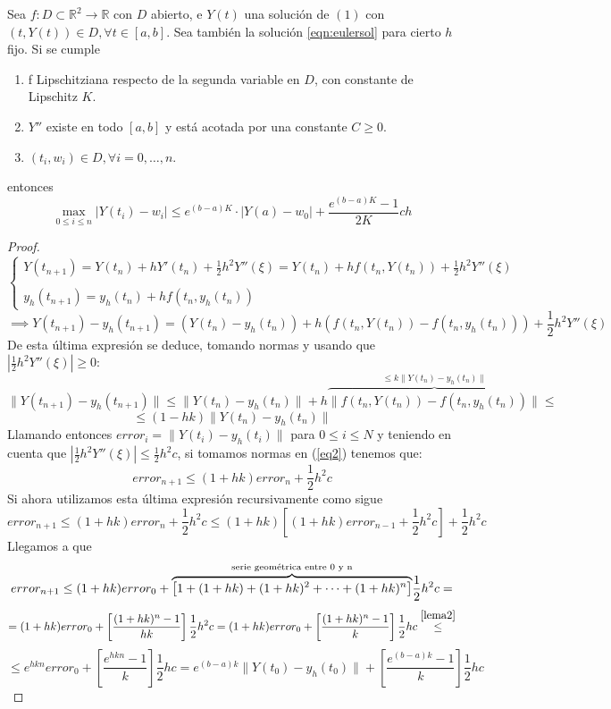 \begin{theorem}
    Sea $f:D\subset \mathbb{R}^2\rightarrow \mathbb{R}$ con $D$ abierto, e $Y(t)$ una solución de $(1)$ con $(t,Y(t))\in D,\forall t\in[a,b]$. Sea también la solución \ref{eqn:eulersol} para cierto $h$ fijo. Si se cumple
    \begin{enumerate}[label=(\alph*)]
        \item f Lipschitziana respecto de la segunda variable en $D$, con constante de Lipschitz $K$.
        \item $Y''$ existe en todo $[a,b]$ y está acotada por una constante $C\geq 0$.
        \item $(t_i,w_i)\in D,\forall i=0,\dots,n$.
    \end{enumerate}
    entonces $$\max_{0\leq i \leq n}|Y(t_i)-w_i| \leq e^{(b-a)K}\cdot |Y(a)-w_0| + \frac{e^{(b-a)K}-1}{2K}ch$$

\end{theorem}
\begin{proof}
    \begin{equation}
\label{eq1}
\left\{
\begin{array}{l}
Y(t_{n+1}) = Y(t_n) + hY'(t_n) + \frac{1}{2}h^2Y''(\xi) = Y(t_n) + hf(t_n, Y(t_n)) + \frac{1}{2}h^2Y''(\xi)\\
\\
y_h(t_{n+1}) = y_h(t_n) + hf(t_n, y_h(t_n))
\end{array}
\right. 
\end{equation}
\begin{equation}
\label{eq2}
\implies Y(t_{n+1}) - y_h(t_{n+1}) = (Y(t_n) - y_h(t_n)) + h(f(t_n, Y(t_n)) - f(t_n, y_h(t_n))) + \frac{1}{2}h^2Y''(\xi)
\end{equation}
De esta última expresión se deduce, tomando normas y usando que $|\frac{1}{2}h^2Y''(\xi)|\geq 0$:
$$
\|Y(t_{n+1}) - y_h(t_{n+1})\| \leq \|Y(t_n) - y_h(t_n)\| + h\overset{\leq k\| Y(t_n) - y_h(t_n)\|}{\overbrace{\|f(t_n, Y(t_n)) - f(t_n, y_h(t_n))\|}} \leq
$$
$$
\leq (1-hk)\|Y(t_n) - y_h(t_n)\|
$$
Llamando entonces $error_i = \|Y(t_i) - y_h(t_i)\|$ para $0\leq i \leq N$ y teniendo en cuenta que $\left|\frac{1}{2}h^2Y''(\xi)\right| \leq \frac{1}{2}h^2c$, si tomamos normas en  (\ref{eq2}) tenemos que:
$$
error_{n+1} \leq (1+hk)error_n + \frac{1}{2}h^2c
$$
Si ahora utilizamos esta última expresión recursivamente como sigue
$$
error_{n+1} \leq (1+hk)error_n + \frac{1}{2}h^2c \leq (1+hk)\left[(1+hk)error_{n-1} + \frac{1}{2}h^2c\right] + \frac{1}{2}h^2c
$$
Llegamos a que
$$
error_{n+1} \leq (1+hk)error_0 + \overset{\textnormal{serie geométrica entre 0 y n}}{\overbrace{\left[ 1 + (1+hk) + (1+hk)^2 + \cdots + (1+hk)^{n}\right]}}\frac{1}{2}h^2c =  
$$
$$
= (1+hk)error_0 + \left[\frac{(1+hk)^n - 1}{hk}\right]\frac{1}{2}h^2c = (1+hk)error_0 + \left[\frac{(1+hk)^n - 1}{k}\right]\frac{1}{2}hc \overset{\ref{lema2}}{\leq} 
$$
$$
\leq e^{hkn}error_0 + \left[\frac{e^{hkn} - 1}{k}\right]\frac{1}{2}hc =  e^{(b-a)k}\|Y(t_0) - y_h(t_0)\| + \left[\frac{e^{(b-a)k} - 1}{k}\right]\frac{1}{2}hc
$$

\end{proof}


